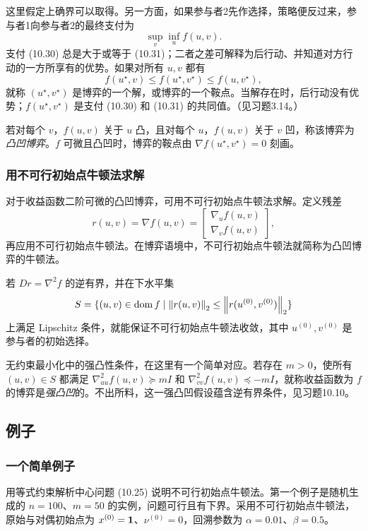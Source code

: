 这里假定上确界可以取得。另一方面，如果参与者2先作选择，策略便反过来，参与者1向参与者2的最终支付为
\begin{equation}\sup_v\inf_u f(u,v).\tag{10.31}\end{equation}
支付 (10.30) 总是大于或等于 (10.31)；二者之差可解释为后行动、并知道对方行动的一方所享有的优势。如果对所有 $u,v$ 都有
\[f(u^\star,v)\le f(u^\star,v^\star)\le f(u,v^\star),\]
就称 $(u^\star,v^\star)$ 是博弈的一个解，或博弈的一个鞍点。当解存在时，后行动没有优势；$f(u^\star,v^\star)$ 是支付 (10.30) 和 (10.31) 的共同值。（见习题3.14。）

若对每个 $v$，$f(u,v)$ 关于 $u$ 凸，且对每个 $u$，$f(u,v)$ 关于 $v$ 凹，称该博弈为\emph{凸凹博弈}。$f$ 可微且凸凹时，博弈的鞍点由 $\nabla f(u^\star,v^\star)=0$ 刻画。

\subsubsection*{用不可行初始点牛顿法求解}
对于收益函数二阶可微的凸凹博弈，可用不可行初始点牛顿法求解。定义残差
\[r(u,v)=\nabla f(u,v)=\begin{bmatrix}\nabla_u f(u,v)\\\nabla_v f(u,v)\end{bmatrix},\]
再应用不可行初始点牛顿法。在博弈语境中，不可行初始点牛顿法就简称为凸凹博弈的牛顿法。

若 $Dr=\nabla^2f$ 的逆有界，并在下水平集
\[S=\{(u,v)\in\operatorname{dom} f\mid\left\lVert r(u,v)\right\rVert_2\le\left\lVert r(u^{(0)},v^{(0)})\right\rVert_2\}\]
上满足 Lipschitz 条件，就能保证不可行初始点牛顿法收敛，其中 $u^{(0)},v^{(0)}$ 是参与者的初始选择。

无约束最小化中的强凸性条件，在这里有一个简单对应。若存在 $m>0$，使所有 $(u,v)\in S$ 都满足 $\nabla_{uu}^2f(u,v)\succeq mI$ 和 $\nabla_{vv}^2f(u,v)\preceq-mI$，就称收益函数为 $f$ 的博弈是\emph{强凸凹}的。不出所料，这一强凸凹假设蕴含逆有界条件，见习题10.10。

\subsection{例子}
\subsubsection*{一个简单例子}
用等式约束解析中心问题 (10.25) 说明不可行初始点牛顿法。第一个例子是随机生成的 $n=100$、$m=50$ 的实例，问题可行且有下界。采用不可行初始点牛顿法，原始与对偶初始点为 $x^{(0)}=\mathbf 1$、$\nu^{(0)}=0$，回溯参数为 $\alpha=0.01$、$\beta=0.5$。


